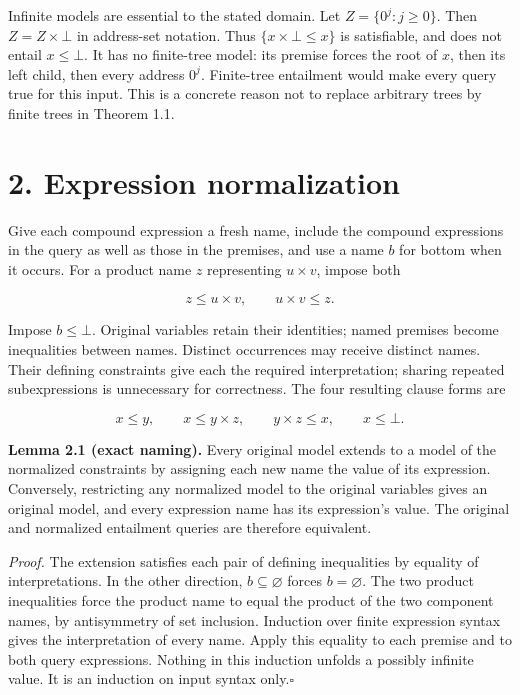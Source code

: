 \documentclass[
  11pt,
  a4paper,
]{article}
\begin{document}
Infinite models are essential to the stated domain. Let
\(Z=\{0^j:j\ge0\}\). Then \(Z=Z\times\bot\) in address-set notation.
Thus \(\{x\times\bot\le x\}\) is satisfiable, and does not entail
\(x\le\bot\). It has no finite-tree model: its premise forces the root
of \(x\), then its left child, then every address \(0^j\). Finite-tree
entailment would make every query true for this input. This is a
concrete reason not to replace arbitrary trees by finite trees in
Theorem 1.1.


\section{2. Expression normalization}\label{expression-normalization}

Give each compound expression a fresh name, include the compound
expressions in the query as well as those in the premises, and use a
name \(b\) for bottom when it occurs. For a product name \(z\)
representing \(u\times v\), impose both

\[z\le u\times v,\qquad u\times v\le z.\]

Impose \(b\le\bot\). Original variables retain their identities; named
premises become inequalities between names. Distinct occurrences may
receive distinct names. Their defining constraints give each the
required interpretation; sharing repeated subexpressions is unnecessary
for correctness. The four resulting clause forms are

\[x\le y,\qquad x\le y\times z,\qquad y\times z\le x,\qquad x\le\bot.\]


\textbf{Lemma 2.1 (exact naming).} Every original model extends to a
model of the normalized constraints by assigning each new name the value
of its expression. Conversely, restricting any normalized model to the
original variables gives an original model, and every expression name
has its expression's value. The original and normalized entailment
queries are therefore equivalent.

\emph{Proof.} The extension satisfies each pair of defining inequalities
by equality of interpretations. In the other direction,
\(b\subseteq\varnothing\) forces \(b=\varnothing\). The two product
inequalities force the product name to equal the product of the two
component names, by antisymmetry of set inclusion. Induction over finite
expression syntax gives the interpretation of every name. Apply this
equality to each premise and to both query expressions. Nothing in this
induction unfolds a possibly infinite value. It is an induction on input
syntax only.\nobreak\hspace{.5em}\(\square\)
\end{document}

